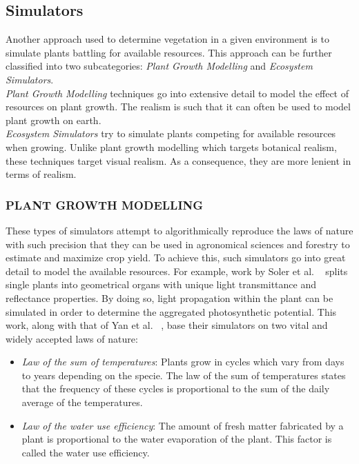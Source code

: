 \subsection{Simulators} \label{Simulators}

Another approach used to determine vegetation in a given environment is to simulate plants battling for available resources. This approach can be further classified into two subcategories: \textit{Plant Growth Modelling} and \textit{Ecosystem Simulators}.\\
\textit{Plant Growth Modelling} techniques go into extensive detail to model the effect of resources on plant growth. The realism is such that it can often be used to model plant growth on earth. \\
\textit{Ecosystem Simulators} try to simulate plants competing for available resources when growing. Unlike plant growth modelling which targets botanical realism, these techniques target visual realism. As a consequence, they are more lenient in terms of realism.

\subsubsection{PLANT GROWTH MODELLING}

These types of simulators attempt to algorithmically reproduce the laws of nature with such precision that they can be used in agronomical sciences and forestry to estimate and maximize crop yield. To achieve this, such simulators go into great detail to model the available resources. For example,  work by Soler et al. ~\cite{Soler2001,Soler2003} splits single plants into geometrical organs with unique light transmittance and reflectance properties. By doing so, light propagation within the plant can be simulated in order to determine the aggregated photosynthetic potential. This work, along with that of Yan et al. ~\cite{Yan2004}, base their simulators on two vital and widely accepted laws of nature:

\begin{itemize}
\item \textit{Law of the sum of temperatures}: Plants grow in cycles which vary from days to years depending on the specie. The law of the sum of temperatures states that the frequency of these cycles is proportional to the sum of the daily average of the temperatures.
\item \textit{Law of the water use efficiency}: The amount of fresh matter fabricated by a plant is proportional to the water evaporation of the plant. This factor is called the water use efficiency. 
\end{itemize}

